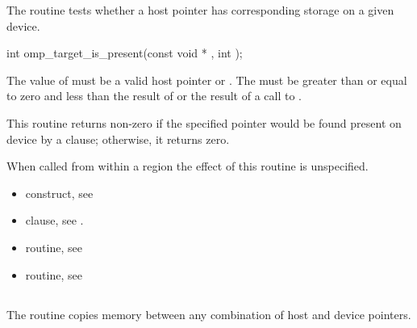 \begin{ccppspecific}
The  routine tests whether a host pointer
has corresponding storage on a given device.

\begin{figure}[t!]
\end{figure}

\format
\begin{boxedcode}
int omp\_target\_is\_present(const void * , int );
\end{boxedcode}

\constraints

The value of  must be a valid host pointer or .
The 
must be greater than or equal to zero and less than the result of
 or the result of a call to
.

\effect

This routine returns non-zero if the specified pointer
would be found present on device  by a 
clause; otherwise, it returns zero.

When called from within a  region 
the effect of this routine is unspecified.

\crossreferences
\begin{itemize}
\item {} construct, see 

\item {} clause, see .

\item {} routine, see 

\item {} routine, see 
\end{itemize}


\subsection{}
\label{subsec:omp_target_memcpy}
\summary

The  routine copies memory between any combination
of host and device pointers.


\end{ccppspecific}
